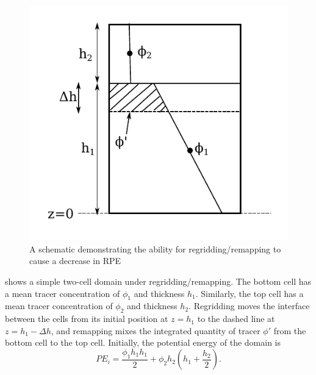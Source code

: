
\begin{figure}
  \includegraphics{../plots/schematic.pdf}
  \caption{\label{fig:schematic} A schematic demonstrating the ability for regridding/remapping to cause a decrease in RPE}
\end{figure}

 shows a simple two-cell domain under regridding/remapping. The bottom cell has a mean tracer concentration of $\phi_1$ and thickness $h_1$. Similarly, the top cell has a mean tracer concentration of $\phi_2$ and thickness $h_2$. Regridding moves the interface between the cells from its initial position at $z = h_1$ to the dashed line at $z = h_1 - \Delta h$, and remapping mixes the integrated quantity of tracer $\phi'$ from the bottom cell to the top cell. Initially, the potential energy of the domain is
%
\begin{equation}
  PE_i = \frac{\phi_1 h_1 h_1}{2} + \phi_2 h_2\left(h_1 + \frac{h_2}{2}\right).
\end{equation}

